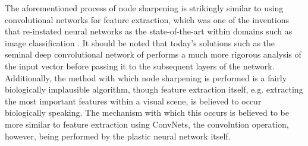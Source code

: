 The aforementioned process of node sharpening is strikingly similar to using convolutional networks for feature extraction, which was one of the inventions that re-instated neural networks as the state-of-the-art within domains such as image classification \citep{LeCun2015}. It should be noted that today's solutions such as the seminal deep convolutional network of \cite{Krizhevsky2012} performs a much more rigorous analysis of the input vector before passing it to the subsequent layers of the network. Additionally, the method with which node sharpening is performed is a fairly biologically implausible algorithm, though feature extraction itself, e.g. extracting the most important features within a visual scene, is believed to occur biologically speaking. The mechanism with which this occurs is believed to be more similar to feature extraction using ConvNets, the convolution operation, however, being performed by the plastic neural network itself.

